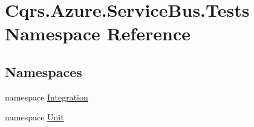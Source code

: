 \hypertarget{namespaceCqrs_1_1Azure_1_1ServiceBus_1_1Tests}{}\section{Cqrs.\+Azure.\+Service\+Bus.\+Tests Namespace Reference}
\label{namespaceCqrs_1_1Azure_1_1ServiceBus_1_1Tests}
\subsection*{Namespaces}
\begin{DoxyCompactItemize}
\item 
namespace \hyperlink{namespaceCqrs_1_1Azure_1_1ServiceBus_1_1Tests_1_1Integration}{Integration}
\item 
namespace \hyperlink{namespaceCqrs_1_1Azure_1_1ServiceBus_1_1Tests_1_1Unit}{Unit}
\end{DoxyCompactItemize}
